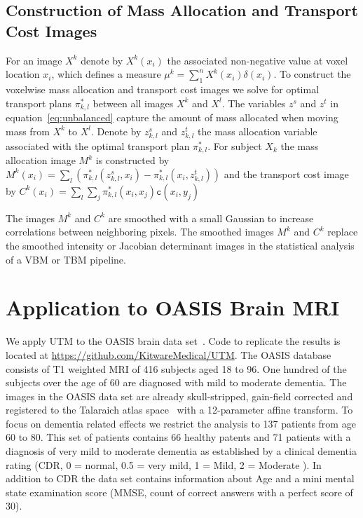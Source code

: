 \documentclass{llncs}
\newcommand{\cost}[0]{\mathtt{c}}
\newcommand{\coupling}[0]{\pi}
\begin{document}
\subsection{Construction of Mass Allocation and Transport Cost Images}
\label{sec:mass}
For an image $X^k$ denote by $X^k(x_i)$ the associated non-negative value at
voxel location $x_i$, which defines a measure $\mu^k = \sum_1^n X^k(x_i)
\delta(x_i)$.  To construct the voxelwise mass allocation and transport cost
images we solve for optimal transport plans $\coupling^*_{k,l}$ between all
images $X^k$ and $X^l$.  The variables $z^s$ and $z^t$ in
equation~\ref{eq:unbalanced} capture the amount of mass allocated when moving
mass from $X^k$ to $X^l$. Denote by $z^s_{k, l}$ and $z^t_{k,l}$ the mass
allocation variable associated with the optimal transport plan
$\coupling^*_{k,l}$. For subject $X_k$ the mass allocation image $M^k$ is
constructed by 
$
M^k(x_i) = \sum_l \left( 
  \coupling^*_{k,l}( z^s_{k, l}, x_i) - 
  \coupling^*_{k,l}( x_i, z^t_{k, l} ) 
\right)
$ 
and the transport cost image by 
$C^k(x_i) = \sum_l \sum_j \coupling^*_{k,l}( x_i, x_j ) \cost(x_i, y_j)$

The images $M^k$ and $C^k$ are smoothed with a small Gaussian to increase
correlations between neighboring pixels. The smoothed images $M^k$ and $C^k$
replace the smoothed intensity or Jacobian determinant images in the
statistical analysis of a VBM or TBM pipeline. 


\section{Application to OASIS Brain MRI}
\label{sec:results}
We apply UTM to the OASIS brain data set~\cite{marcus2010open}. Code to
replicate the results is located at
\url{https://github.com/KitwareMedical/UTM}. The OASIS database consists of T1
weighted MRI of 416 subjects aged 18 to 96.  One hundred of the subjects over
the age of 60 are diagnosed with mild to moderate dementia. The images in the
OASIS data set are already skull-stripped, gain-field corrected and registered
to the Talaraich atlas space~\cite{talaraich:book88} with a 12-parameter affine
transform.  To focus on dementia related effects we restrict the analysis to
137 patients from age 60 to 80. This set of patients contains 66 healthy
patents and 71 patients with a diagnosis of very mild to moderate dementia as
established by a clinical dementia rating (CDR, 0 = normal, 0.5 = very mild, 1
= Mild, 2 = Moderate ). In addition to CDR the data set contains information
about Age and a mini mental state examination score (MMSE, count of correct
answers with a perfect score of 30).
\end{document}
